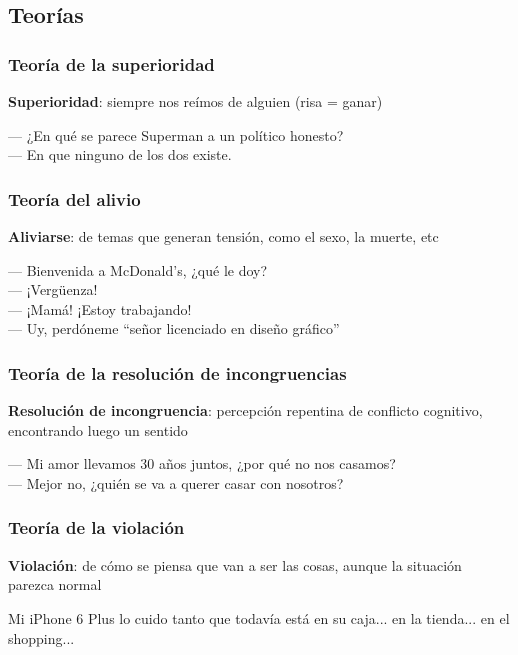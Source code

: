 \subsection{Teorías}
\begin{frame}
    \frametitle{Teoría de la superioridad}

    \textbf{Superioridad}: siempre nos reímos de alguien (risa = ganar)
    \begin{example}
        --- ¿En qué se parece Superman a un político honesto? \\
        --- En que ninguno de los dos existe.
    \end{example}
\end{frame}

\begin{frame}
    \frametitle{Teoría del alivio}

    \textbf{Aliviarse}: de temas que generan tensión, como el sexo, la muerte, etc
    \begin{example}
        --- Bienvenida a McDonald’s, ¿qué le doy? \\
        --- ¡Vergüenza! \\
        --- ¡Mamá! ¡Estoy trabajando! \\
        --- Uy, perdóneme ``señor licenciado en diseño gráfico'' \\
    \end{example}
\end{frame}

\begin{frame}
    \frametitle{Teoría de la resolución de incongruencias}

    \textbf{Resolución de incongruencia}: percepción repentina de conflicto cognitivo, encontrando luego un sentido
    \begin{example}
        --- Mi amor llevamos 30 años juntos, ¿por qué no nos casamos? \\
        --- Mejor no, ¿quién se va a querer casar con nosotros?
    \end{example}
\end{frame}

\begin{frame}
    \frametitle{Teoría de la violación}

    \textbf{Violación}: de cómo se piensa que van a ser las cosas, aunque la situación parezca normal
    \begin{example}
        Mi iPhone 6 Plus lo cuido tanto que todavía está en su caja... en la tienda... en el shopping...
    \end{example}
\end{frame}

